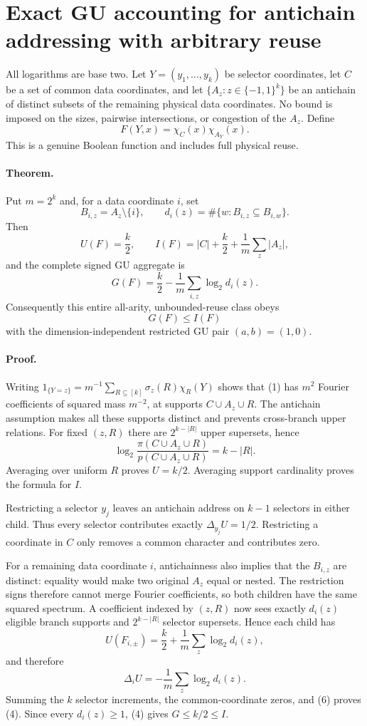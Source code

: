 \section*{Exact GU accounting for antichain addressing with arbitrary reuse}

All logarithms are base two.  Let $Y=(y_1,\ldots,y_k)$ be selector
coordinates, let $C$ be a set of common data coordinates, and let
$\{A_z:z\in\{-1,1\}^k\}$ be an antichain of distinct subsets of the
remaining physical data coordinates.  No bound is imposed on the sizes,
pairwise intersections, or congestion of the $A_z$.  Define
\[
 F(Y,x)=\chi_C(x)\chi_{A_Y}(x).                       \tag{1}
\]
This is a genuine Boolean function and includes full physical reuse.

\paragraph{Theorem.}
Put $m=2^k$ and, for a data coordinate $i$, set
\[
 B_{i,z}=A_z\setminus\{i\},\qquad
 d_i(z)=\#\{w:B_{i,z}\subseteq B_{i,w}\}.            \tag{2}
\]
Then
\[
 U(F)=\frac{k}{2},\qquad
 I(F)=|C|+\frac{k}{2}+\frac1m\sum_z|A_z|,             \tag{3}
\]
and the complete signed GU aggregate is
\[
 \boxed{G(F)=\frac{k}{2}-\frac1m\sum_{i,z}\log_2 d_i(z).} \tag{4}
\]
Consequently this entire all-arity, unbounded-reuse class obeys
\[
 \boxed{G(F)\le I(F)}                                 \tag{5}
\]
with the dimension-independent restricted GU pair $(a,b)=(1,0)$.

\paragraph{Proof.}
Writing $1_{\{Y=z\}}=m^{-1}\sum_{R\subseteq[k]}\sigma_z(R)\chi_R(Y)$
shows that (1) has $m^2$ Fourier coefficients of squared mass $m^{-2}$,
at supports $C\cup A_z\cup R$.  The antichain assumption makes all these
supports distinct and prevents cross-branch upper relations.  For fixed
$(z,R)$ there are $2^{k-|R|}$ upper supersets, hence
\[
 \log_2\frac{\pi(C\cup A_z\cup R)}{p(C\cup A_z\cup R)}=k-|R|.
\]
Averaging over uniform $R$ proves $U=k/2$.  Averaging support cardinality
proves the formula for $I$.

Restricting a selector $y_j$ leaves an antichain address on $k-1$
selectors in either child.  Thus every selector contributes exactly
$\Delta_{y_j}U=1/2$.  Restricting a coordinate in $C$ only removes a
common character and contributes zero.

For a remaining data coordinate $i$, antichainness also implies that the
$B_{i,z}$ are distinct: equality would make two original $A_z$ equal or
nested.  The restriction signs therefore cannot merge Fourier
coefficients, so both children have the same squared spectrum.  A
coefficient indexed by $(z,R)$ now sees exactly $d_i(z)$ eligible branch
supports and $2^{k-|R|}$ selector supersets.  Hence each child has
\[
 U(F_{i,\pm})=\frac{k}{2}+\frac1m\sum_z\log_2d_i(z),
\]
and therefore
\[
 \Delta_iU=-\frac1m\sum_z\log_2d_i(z).                \tag{6}
\]
Summing the $k$ selector increments, the common-coordinate zeros, and
(6) proves (4).  Since every $d_i(z)\ge1$, (4) gives $G\le k/2\le I$.

